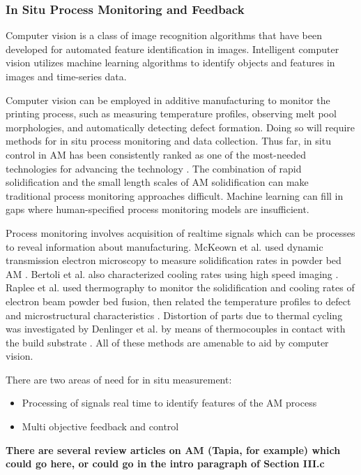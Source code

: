 \subsubsection{In Situ Process Monitoring and Feedback}
Computer vision is a class of image recognition algorithms that have been developed for automated feature identification in images. Intelligent computer vision utilizes machine learning algorithms to identify objects and features in images and time-series data. 

Computer vision can be employed in additive manufacturing to monitor the printing process, such as measuring temperature profiles, observing melt pool morphologies, and automatically detecting defect formation. Doing so will require methods for in situ process monitoring and data collection. Thus far, in situ control in AM has been consistently ranked as one of the most-needed technologies for advancing the technology \cite{Berumen2010, Tapia2014, Mani2017}. The combination of rapid solidification and the small length scales of AM solidification can make traditional process monitoring approaches difficult. Machine learning can fill in gaps where human-specified process monitoring models are insufficient.

Process monitoring involves acquisition of realtime signals which can be processes to reveal information about manufacturing. McKeown et al. used dynamic transmission electron microscopy to measure solidification rates in powder bed AM \cite{McKeown2016}. Bertoli et al. also characterized cooling rates using high speed imaging \cite{Bertoli2017}. Raplee et al. used thermography to monitor the solidification and cooling rates of electron beam powder bed fusion, then related the temperature profiles to defect and microstructural characteristics \cite{Raplee2017}. Distortion of parts due to thermal cycling was investigated by Denlinger et al. by means of thermocouples in contact with the build substrate \cite{Denlinger2015}. All of these methods are amenable to aid by computer vision. 

There are two areas of need for in situ measurement: \begin{itemize}
	\item Processing of signals real time to identify features of the AM process
	\item Multi objective feedback and control
\end{itemize} \textbf{There are several review articles on AM (Tapia, for example) which could go here, or could go in the intro paragraph of Section III.c}

